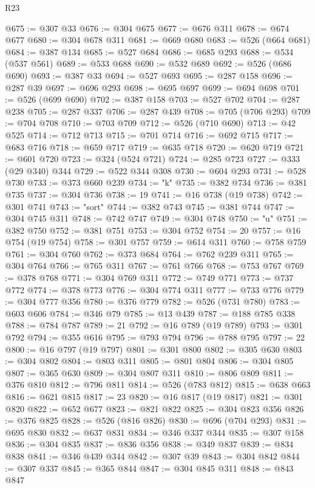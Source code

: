 \begin{lexlean}{R23}
\begin{coremodule}
@675 := @307 @33
@676 := @304 @675
@677 := @676 @311
@678 := @674 @677
@680 := @304 @678 @311
@681 := @669 @680
@683 := @526 (@664 @681)
@684 := @387 @134
@685 := @527 @684
@686 := @685 @293
@688 := @534 (@537 @561)
@689 := @533 @688
@690 := @532 @689
@692 := @526 (@686 @690)
@693 := @387 @33
@694 := @527 @693
@695 := @287 @158
@696 := @287 @39
@697 := @696 @293
@698 := @695 @697
@699 := @694 @698
@701 := @526 (@699 @690)
@702 := @387 @158
@703 := @527 @702
@704 := @287 @238
@705 := @287 @337
@706 := @287 @439
@708 := @705 (@706 @293)
@709 := @704 @708
@710 := @703 @709
@712 := @526 (@710 @690)
@713 := @42 @525
@714 := @712 @713
@715 := @701 @714
@716 := @692 @715
@717 := @683 @716
@718 := @659 @717
@719 := @635 @718
@720 := @620 @719
@721 := @601 @720
@723 := @324 (@524 @721)
@724 := @285 @723
@727 := @333 (@29 @340) @344
@729 := @522 @344 @308
@730 := @604 @293
@731 := @528 @730
@733 := @373 @660 @239
@734 := "k"
@735 := @382 @734
@736 := @381 @735
@737 := @304 @736
@738 := 19
@741 := @16 @738 (@19 @738)
@742 := @301 @741
@743 := "sort"
@744 := @382 @743
@745 := @381 @744
@747 := @304 @745 @311
@748 := @742 @747
@749 := @304 @748
@750 := "u"
@751 := @382 @750
@752 := @381 @751
@753 := @304 @752
@754 := 20
@757 := @16 @754 (@19 @754)
@758 := @301 @757
@759 := @614 @311
@760 := @758 @759
@761 := @304 @760
@762 := @373 @684
@764 := @762 @239 @311
@765 := @304 @764
@766 := @765 @311
@767 := @761 @766
@768 := @753 @767
@769 := @378 @768
@771 := @304 @769 @311
@772 := @749 @771
@773 := @737 @772
@774 := @378 @773
@776 := @304 @774 @311
@777 := @733 @776
@779 := @304 @777 @356
@780 := @376 @779
@782 := @526 (@731 @780)
@783 := @603 @606
@784 := @346 @79
@785 := @13 @439
@787 := @188 @785 @338
@788 := @784 @787
@789 := 21
@792 := @16 @789 (@19 @789)
@793 := @301 @792
@794 := @355 @616
@795 := @793 @794
@796 := @788 @795
@797 := 22
@800 := @16 @797 (@19 @797)
@801 := @301 @800
@802 := @305 @630
@803 := @304 @802
@804 := @803 @311
@805 := @801 @804
@806 := @304 @805
@807 := @365 @630
@809 := @304 @807 @311
@810 := @806 @809
@811 := @376 @810
@812 := @796 @811
@814 := @526 (@783 @812)
@815 := @638 @663
@816 := @621 @815
@817 := 23
@820 := @16 @817 (@19 @817)
@821 := @301 @820
@822 := @652 @677
@823 := @821 @822
@825 := @304 @823 @356
@826 := @376 @825
@828 := @526 (@816 @826)
@830 := @696 (@704 @293)
@831 := @695 @830
@832 := @637 @831
@834 := @346 @337 @344
@835 := @307 @158
@836 := @304 @835
@837 := @836 @356
@838 := @349 @837
@839 := @834 @838
@841 := @346 @439 @344
@842 := @307 @39
@843 := @304 @842
@844 := @307 @337
@845 := @365 @844
@847 := @304 @845 @311
@848 := @843 @847

\end{coremodule}
\end{lexlean}
